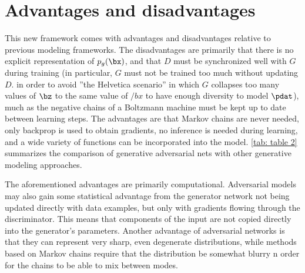 \section{Advantages and disadvantages}

This new framework comes with advantages and disadvantages relative to previous modeling frameworks. The disadvantages are primarily that there is no explicit representation of $p_g(\bx)$, and that $D$ must be synchronized well with $G$ during training (in particular, $G$ must not be trained too much without updating $D$. in order to avoid ''the Helvetica scenario''
in which $G$ collapses too many values of $\bz$ to the same value of $/bx$ to have enough diversity to model $\pdat$), much as the negative chains of a Boltzmann machine must be kept up to date between learning steps. The advantages are that Markov chains are never needed, only backprop is used to obtain gradients, no inference is needed during learning, and a wide variety of functions can be incorporated into the model. \ref{tab: table 2}
summarizes the comparison of generative adversarial nets with other generative modeling approaches.

The aforementioned advantages are primarily computational. Adversarial models may also gain some statistical advantage from the generator network not being updated directly with data examples, but only with gradients flowing through the discriminator. This means that components of the input are not copied directly into the generator’s parameters. Another advantage of adversarial networks is that they can represent very sharp, even degenerate distributions, while methods based on Markov chains require that the distribution be somewhat blurry n order for the chains to be able to mix between modes.
